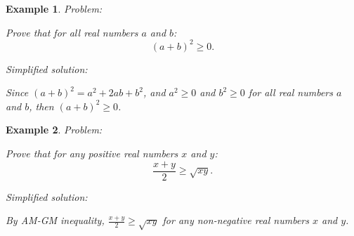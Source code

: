 \documentclass{article}
\newtheorem{example}{Example}
\begin{document}



\begin{example}
Problem:
\begin{tcolorbox}[colback=yellow!10, width=\linewidth]
Prove that for all real numbers $a$ and $b$:
    $$(a+b)^2 \geq 0.$$
\end{tcolorbox}

Simplified solution:
\begin{tcolorbox}[colback=blue!10, width=\linewidth]
Since $(a+b)^2 = a^2 + 2ab + b^2$, and $a^2 \ge 0$ and $b^2 \ge 0$ for all real numbers $a$ and $b$, then $(a+b)^2 \ge 0$.

\end{tcolorbox}
\end{example}



\begin{example}
Problem:
\begin{tcolorbox}[colback=yellow!10, width=\linewidth]
Prove that for any positive real numbers $x$ and $y$:
    $$\frac{x+y}{2} \geq \sqrt{xy}.$$
\end{tcolorbox}

Simplified solution:
\begin{tcolorbox}[colback=blue!10, width=\linewidth]
By AM-GM inequality, $\frac{x+y}{2} \ge \sqrt{xy}$ for any non-negative real numbers $x$ and $y$.

\end{tcolorbox}
\end{example}
\end{document}
